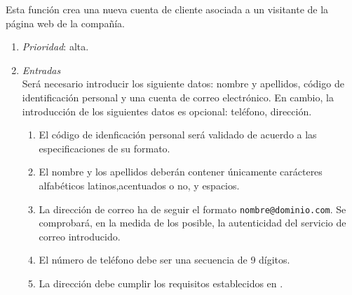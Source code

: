 
 \label{fun:registrarse}
	Esta función crea una nueva cuenta de cliente asociada a un visitante de la página web de la compañía.

	\begin{enumerate}
		\item \textit{Prioridad}: alta.
		\item \textit{Entradas}\\
			Será necesario introducir los siguiente datos: nombre y apellidos, código de identificación personal y una cuenta de correo electrónico. En cambio, la introducción de los siguientes datos es opcional: teléfono, dirección.

			\begin{enumerate}
				\item El código de idenficación personal será validado de acuerdo a las especificaciones de su formato.
				\item El nombre y los apellidos deberán contener únicamente carácteres alfabéticos latinos,\break acentuados o no, y espacios.
				\item La dirección de correo ha de seguir el formato \verb|nombre@dominio.com|. Se comprobará, en la medida de los posible, la autenticidad del servicio de correo introducido.
				\item El número de teléfono debe ser una secuencia de 9 dígitos. %
				\item La dirección debe cumplir los requisitos establecidos en .
			\end{enumerate}
		

\end{enumerate}
